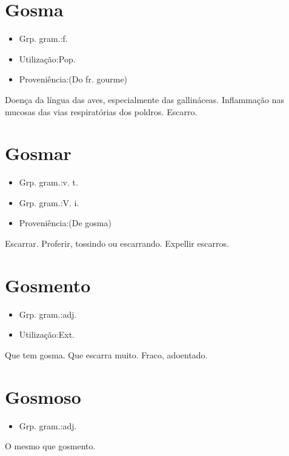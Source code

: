 \section{Gosma}
\begin{itemize}
\item {Grp. gram.:f.}
\end{itemize}
\begin{itemize}
\item {Utilização:Pop.}
\end{itemize}
\begin{itemize}
\item {Proveniência:(Do fr. \textunderscore gourme\textunderscore )}
\end{itemize}
Doença da língua das aves, especialmente das gallináceas.
Inflammação nas mucosas das vias respiratórias dos poldros.
Escarro.
\section{Gosmar}
\begin{itemize}
\item {Grp. gram.:v. t.}
\end{itemize}
\begin{itemize}
\item {Grp. gram.:V. i.}
\end{itemize}
\begin{itemize}
\item {Proveniência:(De \textunderscore gosma\textunderscore )}
\end{itemize}
Escarrar.
Proferir, tossindo ou escarrando.
Expellir escarros.
\section{Gosmento}
\begin{itemize}
\item {Grp. gram.:adj.}
\end{itemize}
\begin{itemize}
\item {Utilização:Ext.}
\end{itemize}
Que tem gosma.
Que escarra muito.
Fraco, adoentado.
\section{Gosmoso}
\begin{itemize}
\item {Grp. gram.:adj.}
\end{itemize}
O mesmo que \textunderscore gosmento\textunderscore .
